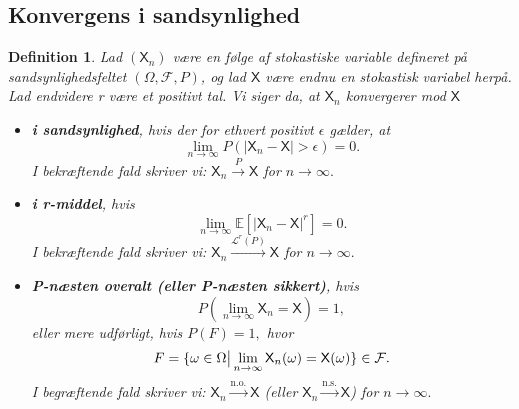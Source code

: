 \documentclass{article}
\newcommand{\E}{\mathbb{E}}
\newcommand{\1}{\mathbbm{1}}
\newcommand{\X}{\mathsf{X}}
\newcommand{\lclass}{\mathcal{L}}
\newcommand{\pfield}{(\Omega, \mathcal{F}, P)}
\theoremstyle{boxed}
\newtheorem{definition}[theorem]{Definition}
\begin{document}
\subsection{Konvergens i sandsynlighed}
\begin{theorem-box}
    \begin{definition}
        Lad $(\X_n)$ være en følge af stokastiske variable defineret på sandsynlighedsfeltet $\pfield$, og lad $\X$ være endnu en stokastisk variabel herpå. Lad endvidere r være et positivt tal. Vi siger da, at $\X_n$ konvergerer mod $\X$
        \begin{itemize}
            \item \textbf{i sandsynlighed}, hvis der for ethvert positivt $\epsilon$ gælder, at $$\lim_{n\rightarrow\infty}P(|\X_n-\X|>\epsilon)=0.$$ I bekræftende fald skriver vi: $\X_n\stackrel{P}{\longrightarrow}\X$ for $n\rightarrow \infty.$
            \item \textbf{i r-middel}, hvis $$\lim_{n\rightarrow\infty}\E\left[|\X_n-\X|^r\right]=0.$$ I bekræftende fald skriver vi: $\X_n\stackrel{\lclass^r(P)}{\longrightarrow}\X$ for $n\rightarrow \infty.$
            \item \textbf{P-næsten overalt (eller P-næsten sikkert)}, hvis $$P(\lim_{n\rightarrow\infty}\X_n=\X)=1,$$ eller mere udførligt, hvis $P(F)=1,$ hvor $$F=\{\omega\in\Omega\big{|}\lim_{n\rightarrow\infty}\X_n(\omega)=\X(\omega)\}\in \mathcal{F}.$$ I begræftende fald skriver vi: $\X_n\stackrel{\text{n.o.}}{\longrightarrow}\X$ (eller $\X_n\stackrel{\text{n.s.}}{\longrightarrow}\X$) for $n\rightarrow\infty.$
        \end{itemize}
    \end{definition}
\end{theorem-box}
\end{document}

